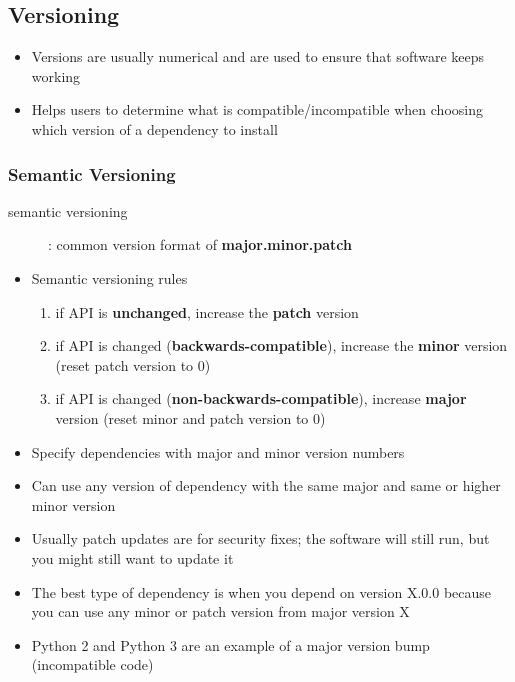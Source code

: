 \documentclass[letterpaper,12pt]{article}
\begin{document}
\subsection{Versioning}
\begin{itemize}
 \item Versions are usually numerical and are used to ensure that software keeps working
 \item Helps users to determine what is compatible/incompatible when choosing which version of a dependency to install
\end{itemize}

\subsubsection{Semantic Versioning}

\begin{description}
 \item[semantic versioning]: common version format of \textbf{major.minor.patch}
\end{description}

\begin{itemize}
 \item Semantic versioning rules
       \begin{enumerate}
        \item if API is \textbf{unchanged}, increase the \textbf{patch} version
        \item if API is changed (\textbf{backwards-compatible}), increase the \textbf{minor} version (reset patch version to 0)
        \item if API is changed (\textbf{non-backwards-compatible}), increase \textbf{major} version (reset minor and patch version to 0)
       \end{enumerate}
 \item Specify dependencies with major and minor version numbers
 \item Can use any version of dependency with the same major and same or higher minor version
 \item Usually patch updates are for security fixes; the software will still run, but you might still want to update it
 \item The best type of dependency is when you depend on version X.0.0 because you can use any minor or patch version from major version X
 \item Python 2 and Python 3 are an example of a major version bump (incompatible code)
\end{itemize}
\end{document}
